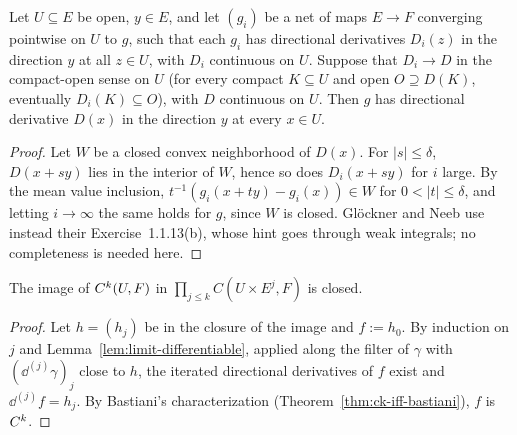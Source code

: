 \begin{lemma}
  \label{lem:limit-differentiable}
  \leanok
  Let $U \subseteq E$ be open, $y \in E$, and let $(g_i)$ be a net of maps $E \to F$ converging
  pointwise on $U$ to $g$, such that each $g_i$ has directional derivatives $D_i(z)$ in the
  direction $y$ at all $z \in U$, with $D_i$ continuous on $U$. Suppose that $D_i \to D$ in the
  compact-open sense on $U$ (for every compact $K \subseteq U$ and open $O \supseteq D(K)$,
  eventually $D_i(K) \subseteq O$), with $D$ continuous on $U$. Then $g$ has directional
  derivative $D(x)$ in the direction $y$ at every $x \in U$.
\end{lemma}

\begin{proof}
  \leanok
  Let $W$ be a closed convex neighborhood of $D(x)$. For $|s| \leq \delta$, $D(x + sy)$ lies in
  the interior of $W$, hence so does $D_i(x + sy)$ for $i$ large. By the mean value inclusion,
  $t^{-1}(g_i(x + ty) - g_i(x)) \in W$ for $0 < |t| \leq \delta$, and letting $i \to \infty$ the
  same holds for $g$, since $W$ is closed. Glöckner and Neeb use instead their Exercise~1.1.13(b),
  whose hint goes through weak integrals; no completeness is needed here.
\end{proof}

\begin{lemma}
  \label{lem:ck-closed-image}
  \leanok
  The image of $C^{k}(U, F)$ in $\prod_{j \leq k} C(U \times E^j, F)$ is closed.
\end{lemma}

\begin{proof}
  \leanok
  Let $h = (h_j)$ be in the closure of the image and $f := h_0$. By induction on $j$ and
  Lemma~\ref{lem:limit-differentiable}, applied along the filter of $\gamma$ with
  $(\dd^{(j)}\gamma)_j$ close to $h$, the iterated directional derivatives of $f$ exist and
  $\dd^{(j)} f = h_j$. By Bastiani's characterization (Theorem~\ref{thm:ck-iff-bastiani}), $f$
  is $C^{k}$.
\end{proof}

